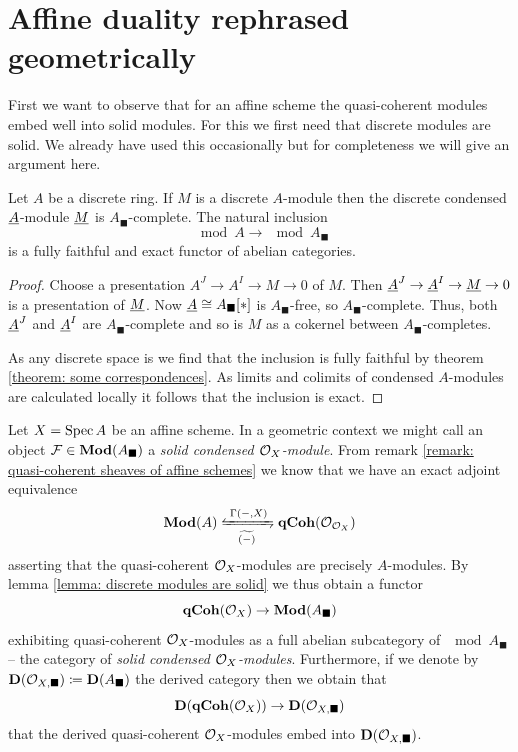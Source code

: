 \section{Affine duality rephrased geometrically}

First we want to observe that for an affine scheme the quasi-coherent modules embed well into solid modules. For this we first need that discrete modules are solid. We already have used this occasionally but for completeness we will give an argument here.
\begin{lemma}
	\label{lemma: discrete modules are solid}
	
	Let $A$ be a discrete ring. If $M$ is a discrete $A$-module then the discrete condensed $\underline{A}$-module $\underline{M}$ is $A_\blacksquare$-complete. The natural inclusion
		$$\mod{A}\to\mod{A_\blacksquare}$$
	is a fully faithful and exact functor of abelian categories.
\end{lemma}
\begin{proof}
	Choose a presentation $A^J\to A^I\to M\to 0$ of $M$. Then $\underline{A}^J\to\underline{A}^I \to \underline{M} \to 0$ is a presentation of $\underline{M}$. Now $\underline{A}\cong A_\blacksquare[\ast]$ is $A_\blacksquare$-free, so $A_\blacksquare$-complete. Thus, both $\underline{A}^J$ and $\underline{A}^I$ are $A_\blacksquare$-complete and so is $M$ as a cokernel between $A_\blacksquare$-completes.
	
	As any discrete space is \CGWH we find that the inclusion is fully faithful by theorem \ref{theorem: some correspondences}. As limits and colimits of condensed $A$-modules are calculated locally it follows that the inclusion is exact.
\end{proof}

\begin{remark}
	Let $X=\operatorname{Spec} A$ be an affine scheme. In a geometric context we might call an object ${\mathcal{F}}\in {{\mathbf{Mod}}(A_\blacksquare)}$ a \emph{solid condensed ${{\mathcal{O}}_{X}}$-module}. From remark \ref{remark: quasi-coherent sheaves of affine schemes} we know that we have an exact adjoint equivalence
		$$\mod{A} \xleftrightarrows{\Gamma(-, X)}{\associatedSheaf{(-)}} \qCoh{\struct{X}}$$
	asserting that the quasi-coherent ${{\mathcal{O}}_{X}}$-modules are precisely $A$-modules. By lemma \ref{lemma: discrete modules are solid} we thus obtain a functor
		$${{\mathbf{qCoh}}({{\mathcal{O}}_{X}})} \to {{\mathbf{Mod}}(A_\blacksquare)}$$
	exhibiting quasi-coherent ${{\mathcal{O}}_{X}}$-modules as a full abelian subcategory of $\mod{A_\blacksquare}$ -- the category of \emph{solid condensed ${{\mathcal{O}}_{X}}$-modules}. Furthermore, if we denote by ${{\mathbf{D}}({{\mathcal{O}}_{X, \blacksquare}})} \coloneqq {{\mathbf{D}}(A_\blacksquare)}$ the derived category then we obtain that
		$${{\mathbf{D}}({{\mathbf{qCoh}}({{\mathcal{O}}_{X}})})} \to {{\mathbf{D}}({{\mathcal{O}}_{X, \blacksquare}})}$$
	\ie that the derived quasi-coherent ${{\mathcal{O}}_{X}}$-modules embed into ${{\mathbf{D}}({{\mathcal{O}}_{X, \blacksquare}})}$.
\end{remark}

